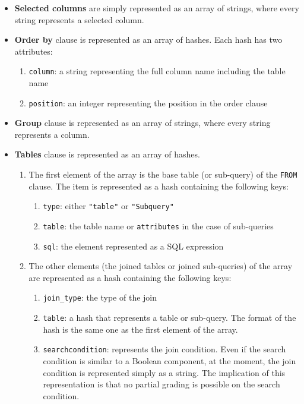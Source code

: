 \begin{itemize}
    \item \textbf{Selected columns} are simply represented as an array of strings, where every string represents a selected column.
    \item \textbf{Order by} clause is represented as an array of hashes. Each hash has two attributes:
    \begin{enumerate}
        \item \texttt{column}: a string representing the full column name including the table name
        \item \texttt{position}: an integer representing the position in the order clause
    \end{enumerate}
    \item \textbf{Group} clause is represented as an array of strings, where every string represents a column.
    \item \textbf{Tables} clause is represented as an array of hashes.
    \begin{enumerate}
        \item The first element of the array is the base table (or sub-query) of the \texttt{FROM} clause. The item is represented as a hash containing the following keys:
        \begin{enumerate}
            \item \texttt{type}: either \texttt{"table"} or \texttt{"Subquery"}
            \item \texttt{table}: the table name or \texttt{attributes} in the case of sub-queries
            \item \texttt{sql}: the element represented as a SQL expression
        \end{enumerate}
        \item The other elements (the joined tables or joined sub-queries) of the array are represented as a hash containing the following keys:
        \begin{enumerate}
            \item \texttt{join_type}: the type of the join
            \item \texttt{table}: a hash that represents a table or sub-query. The format of the hash is the same one as the first element of the array.
            \item \texttt{searchcondition}: represents the join condition. Even if the search condition is similar to a Boolean component, at the moment, the join condition is represented simply as a string. The implication of this representation is that no partial grading is possible on the search condition.

\end{enumerate}
\end{enumerate}
\end{itemize}
